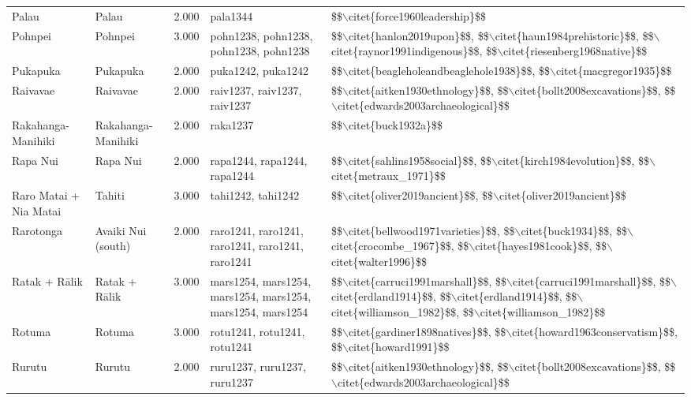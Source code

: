 \begin{longtable}{p{1.8cm}p{1.8cm}p{1.8cm}p{2cm}p{7cm}}
  Palau & Palau & 2.000 & pala1344 & \$\$$\backslash$citet\{force1960leadership\}\$\$ \\ 
  Pohnpei & Pohnpei & 3.000 & pohn1238, pohn1238, pohn1238, pohn1238 & \$\$$\backslash$citet\{hanlon2019upon\}\$\$, \$\$$\backslash$citet\{haun1984prehistoric\}\$\$, \$\$$\backslash$citet\{raynor1991indigenous\}\$\$, \$\$$\backslash$citet\{riesenberg1968native\}\$\$ \\ 
  Pukapuka & Pukapuka & 2.000 & puka1242, puka1242 & \$\$$\backslash$citet\{beagleholeandbeaglehole1938\}\$\$, \$\$$\backslash$citet\{macgregor1935\}\$\$ \\ 
  Raivavae & Raivavae & 2.000 & raiv1237, raiv1237, raiv1237 & \$\$$\backslash$citet\{aitken1930ethnology\}\$\$, \$\$$\backslash$citet\{bollt2008excavations\}\$\$, \$\$$\backslash$citet\{edwards2003archaeological\}\$\$ \\ 
  Rakahanga-Manihiki & Rakahanga-Manihiki & 2.000 & raka1237 & \$\$$\backslash$citet\{buck1932a\}\$\$ \\ 
  Rapa Nui & Rapa Nui & 2.000 & rapa1244, rapa1244, rapa1244 & \$\$$\backslash$citet\{sahlins1958social\}\$\$, \$\$$\backslash$citet\{kirch1984evolution\}\$\$, \$\$$\backslash$citet\{metraux\_1971\}\$\$ \\ 
  Raro Matai + Nia Matai & Tahiti & 3.000 & tahi1242, tahi1242 & \$\$$\backslash$citet\{oliver2019ancient\}\$\$, \$\$$\backslash$citet\{oliver2019ancient\}\$\$ \\ 
  Rarotonga & Avaiki Nui (south) & 2.000 & raro1241, raro1241, raro1241, raro1241, raro1241 & \$\$$\backslash$citet\{bellwood1971varieties\}\$\$, \$\$$\backslash$citet\{buck1934\}\$\$, \$\$$\backslash$citet\{crocombe\_1967\}\$\$, \$\$$\backslash$citet\{hayes1981cook\}\$\$, \$\$$\backslash$citet\{walter1996\}\$\$ \\ 
  Ratak + Rālik & Ratak + Rālik & 3.000 & mars1254, mars1254, mars1254, mars1254, mars1254, mars1254 & \$\$$\backslash$citet\{carruci1991marshall\}\$\$, \$\$$\backslash$citet\{carruci1991marshall\}\$\$, \$\$$\backslash$citet\{erdland1914\}\$\$, \$\$$\backslash$citet\{erdland1914\}\$\$, \$\$$\backslash$citet\{williamson\_1982\}\$\$, \$\$$\backslash$citet\{williamson\_1982\}\$\$ \\ 
  Rotuma & Rotuma & 3.000 & rotu1241, rotu1241, rotu1241 & \$\$$\backslash$citet\{gardiner1898natives\}\$\$, \$\$$\backslash$citet\{howard1963conservatism\}\$\$, \$\$$\backslash$citet\{howard1991\}\$\$ \\ 
  Rurutu & Rurutu & 2.000 & ruru1237, ruru1237, ruru1237 & \$\$$\backslash$citet\{aitken1930ethnology\}\$\$, \$\$$\backslash$citet\{bollt2008excavations\}\$\$, \$\$$\backslash$citet\{edwards2003archaeological\}\$\$ \\ 

\end{longtable}
